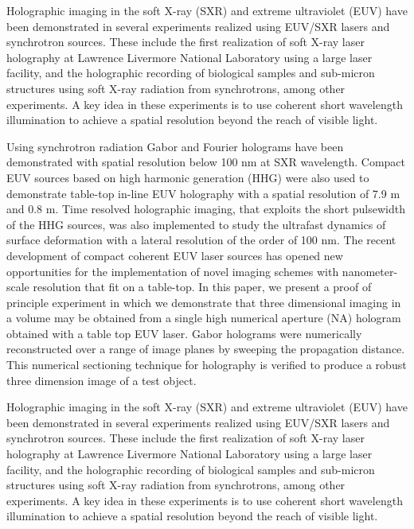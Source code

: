 \documentclass[]{IEEEphot}
\begin{document}
Holographic imaging in the soft X-ray (SXR) and extreme ultraviolet (EUV) have been demonstrated in several experiments realized using EUV/SXR lasers and synchrotron sources. These include the first realization of soft X-ray laser holography at Lawrence Livermore National Laboratory using a large laser facility, and the holographic recording of biological samples and sub-micron structures using soft X-ray radiation from synchrotrons, among other experiments.  A key idea in these experiments is to use coherent short wavelength illumination to achieve a spatial resolution beyond the reach of visible light.  

Using synchrotron radiation Gabor and Fourier holograms have been demonstrated with spatial resolution below 100 nm at SXR wavelength.  Compact EUV sources based on high harmonic generation (HHG) were also used to demonstrate table-top in-line EUV holography with a spatial resolution of 7.9 m and 0.8 m.  Time resolved holographic imaging, that exploits the short pulsewidth of the HHG sources, was also implemented to study the ultrafast dynamics of surface deformation with a lateral resolution of the order of 100 nm.  The recent development of compact coherent EUV laser sources has opened new opportunities for the implementation of novel imaging schemes with nanometer-scale resolution that fit on a table-top. In this paper, we present a proof of principle experiment in which we demonstrate that three dimensional imaging in a volume may be obtained from a single high numerical  aperture (NA) hologram obtained with a table top EUV laser. Gabor holograms were numerically reconstructed over a range of image planes by sweeping the propagation distance. This numerical sectioning technique for holography is verified to produce a robust three dimension image of a test object.  

Holographic imaging in the soft X-ray (SXR) and extreme ultraviolet (EUV) have been demonstrated in several experiments realized using EUV/SXR lasers and synchrotron sources. These include the first realization of soft X-ray laser holography at Lawrence Livermore National Laboratory using a large laser facility, and the holographic recording of biological samples and sub-micron structures using soft X-ray radiation from synchrotrons, among other experiments.  A key idea in these experiments is to use coherent short wavelength illumination to achieve a spatial resolution beyond the reach of visible light.  
\end{document}

